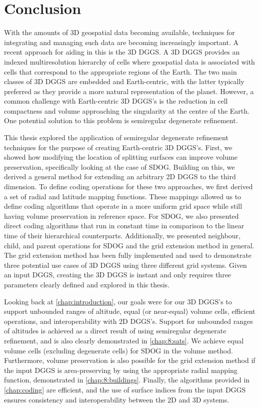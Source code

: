 \chapter{Conclusion} \label{chap:conclusion}
With the amounts of 3D geospatial data becoming available, techniques for integrating and managing such data are becoming increasingly important.
A recent approach for aiding in this is the 3D DGGS.
A 3D DGGS provides an indexed multiresolution hierarchy of cells where geospatial data is associated with cells that correspond to the appropriate regions of the Earth.
The two main classes of 3D DGGS are embedded and Earth-centric, with the latter typically preferred as they provide a more natural representation of the planet.
However, a common challenge with Earth-centric 3D DGGS's is the reduction in cell compactness and volume approaching the singularity at the centre of the Earth.
One potential solution to this problem is semiregular degenerate refinement.


This thesis explored the application of semiregular degenerate refinement techniques for the purpose of creating Earth-centric 3D DGGS's.
First, we showed how modifying the location of splitting surfaces can improve volume preservation, specifically looking at the case of SDOG.
Building on this, we derived a general method for extending an arbitrary 2D DGGS to the third dimension.
To define coding operations for these two approaches, we first derived a set of radial and latitude mapping functions.
These mappings allowed us to define coding algorithms that operate in a more uniform grid space while still having volume preservation in reference space.
For SDOG, we also presented direct coding algorithms that run in constant time in comparison to the linear time of their hierarchical counterparts.
Additionally, we presented neighbour, child, and parent operations for SDOG and the grid extension method in general.
The grid extension method has been fully implemented and used to demonstrate three potential use cases of 3D DGGS using three different grid systems.
Given an input DGGS, creating the 3D DGGS is instant and only requires three parameters clearly defined and explored in this thesis.


Looking back at \cref{chap:introduction}, our goals were for our 3D DGGS's to support unbounded ranges of altitude, equal (or near-equal) volume cells, efficient operations, and interoperability with 2D DGGS's.
Support for unbounded ranges of altitudes is achieved as a direct result of using semiregular degenerate refinement, and is also clearly demonstrated in \cref{chap:8:sats}.
We achieve equal volume cells (excluding degenerate cells) for SDOG in the volume method.
Furthermore, volume preservation is also possible for the grid extension method if the input DGGS is area-preserving by using the appropriate radial mapping function, demonstrated in \cref{chap:8:buildings}.
Finally, the algorithms provided in \cref{chap:coding} are efficient, and the use of surface indices from the input DGGS ensures consistency and interoperability between the 2D and 3D systems.


